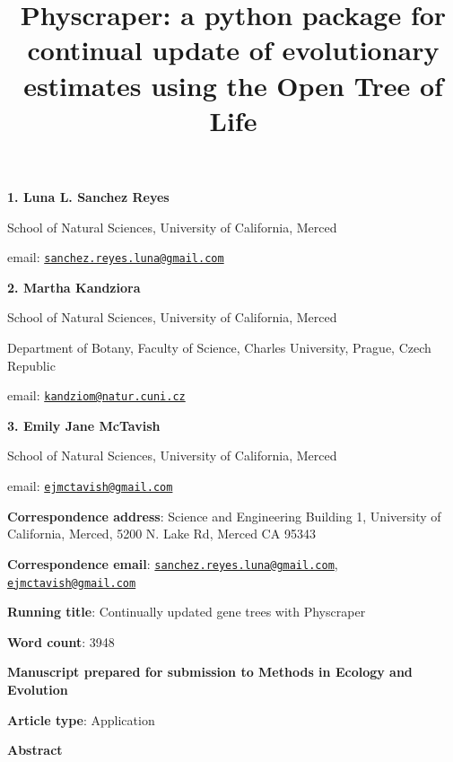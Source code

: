 \documentclass[]{article}
\title{Physcraper: a python package for continual update of evolutionary estimates using the Open Tree of Life}
\author{}
\date{\vspace{-2.5em}}
\begin{document}
\maketitle

\textbf{1. Luna L. Sanchez Reyes}

School of Natural Sciences, University of California, Merced

email: \href{mailto:sanchez.reyes.luna@gmail.com}{\nolinkurl{sanchez.reyes.luna@gmail.com}}

\textbf{2. Martha Kandziora}

School of Natural Sciences, University of California, Merced

Department of Botany, Faculty of Science, Charles University, Prague, Czech Republic

email: \href{mailto:kandziom@natur.cuni.cz}{\nolinkurl{kandziom@natur.cuni.cz}}

\textbf{3. Emily Jane McTavish}

School of Natural Sciences, University of California, Merced

email: \href{mailto:ejmctavish@gmail.com}{\nolinkurl{ejmctavish@gmail.com}}

\textbf{Correspondence address}: Science and Engineering Building 1, University of California, Merced, 5200 N. Lake Rd, Merced CA 95343

\textbf{Correspondence email}: \href{mailto:sanchez.reyes.luna@gmail.com}{\nolinkurl{sanchez.reyes.luna@gmail.com}}, \href{mailto:ejmctavish@gmail.com}{\nolinkurl{ejmctavish@gmail.com}}

\textbf{Running title}: Continually updated gene trees with Physcraper

\textbf{Word count}: 3948

\textbf{Manuscript prepared for submission to Methods in Ecology and Evolution}

\textbf{Article type}: Application

\newpage

\begingroup\Large

\textbf{Abstract}
\endgroup
\end{document}
